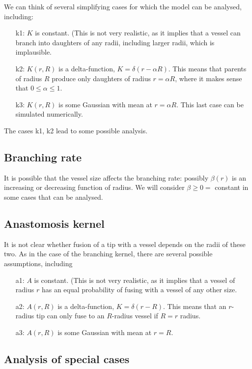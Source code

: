 We can think of several simplifying cases for which the model can be analysed, including:

\begin{itemize}
	\item[k1:] $K$ is constant. (This is not very realistic, as it implies that a vessel can branch into daughters of any radii, including larger radii, which is implausible.
	\item[k2:] $K(r,R)$ is a delta-function, 
	$K=\delta(r-\alpha R)$. This means that parents of radius $R$ produce only daughters of radius $r=\alpha R$, where it makes sense that $0\le \alpha \le 1$.
	\item[k3:] $K(r,R)$ is some Gaussian with mean at $r=\alpha R$. This last case can be simulated numerically.
\end{itemize}
The cases k1, k2 lead to some possible analysis.

\subsection{Branching rate}
It is possible that the vessel size affects the branching rate: possibly $\beta(r)$ is an increasing or decreasing function of radius. We will consider $\beta \ge 0 =$ constant in some cases that can be analysed.

\subsection{Anastomosis kernel}

It is not clear whether fusion of a tip with a vessel depends on the radii of these two. As in the case of the branching kernel, there are several possible assumptions, including

\begin{itemize}
	\item[a1:] $A$ is constant. (This is not very realistic, as it implies that a vessel of radius $r$ has an equal probability of fusing with a vessel of any other size. 
	\item[a2:] $A(r,R)$ is a delta-function, 
	$K=\delta(r-R)$. This means that an $r$-radius tip can only fuse to an $R$-radius vessel if $R=r$ radius.
	\item[a3:] $A(r,R)$ is some Gaussian with mean at $r=R$. 
\end{itemize}


\subsection{Analysis of special cases}

